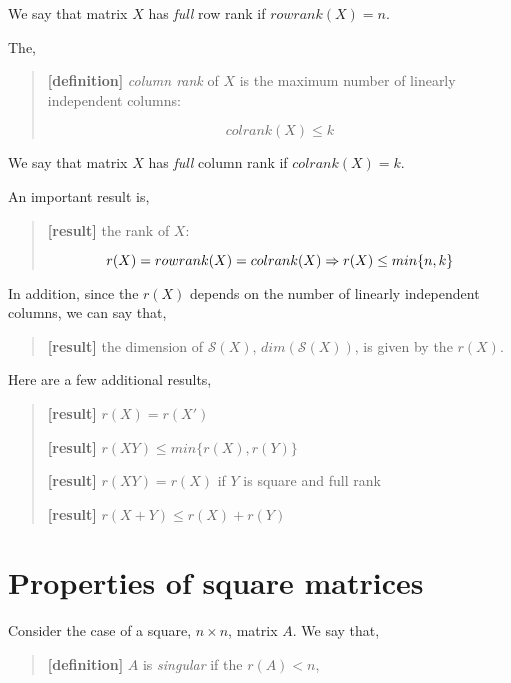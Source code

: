 \documentclass[
  letterpaper,
  DIV=11,
  numbers=noendperiod]{scrreprt}
\begin{document}
We say that matrix \(X\) has \emph{full} row rank if \(rowrank(X)=n\).

The,

\begin{quote}
\textbf{{[}definition{]}} \emph{column rank} of \(X\) is the maximum
number of linearly independent columns:

\[
colrank(X) \leq k
\]
\end{quote}

We say that matrix \(X\) has \emph{full} column rank if
\(colrank(X)=k\).

An important result is,

\begin{quote}
\textbf{{[}result{]}} the rank of \(X\):

\[
r(X) = rowrank(X)=colrank(X) \\
\Rightarrow r(X)\leq min\{n,k\}
\]
\end{quote}

In addition, since the \(r(X)\) depends on the number of linearly
independent columns, we can say that,

\begin{quote}
\textbf{{[}result{]}} the dimension of \(\mathcal{S}(X)\),
\(dim(\mathcal{S}(X))\), is given by the \(r(X)\).
\end{quote}

Here are a few additional results,

\begin{quote}
\textbf{{[}result{]}} \(r(X)=r(X')\)

\textbf{{[}result{]}} \(r(XY)\leq min\{r(X),r(Y)\}\)

\textbf{{[}result{]}} \(r(XY)=r(X)\) if \(Y\) is square and full rank

\textbf{{[}result{]}} \(r(X+Y)\leq r(X) + r(Y)\)
\end{quote}

\hypertarget{properties-of-square-matrices}{%
\section{Properties of square
matrices}\label{properties-of-square-matrices}}

Consider the case of a square, \(n\times n\), matrix \(A\). We say that,

\begin{quote}
\textbf{{[}definition{]}} \(A\) is \emph{singular} if the \(r(A)<n\),
\end{quote}
\end{document}
